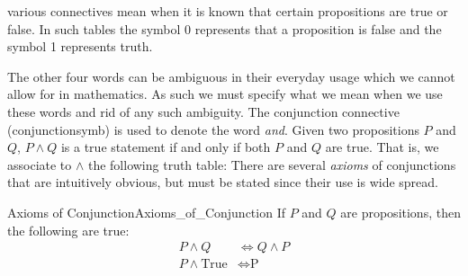         various connectives mean when it is known that certain propositions are true
        or false. In such tables the symbol 0 represents that a proposition is false
        and the symbol 1 represents truth.
        \par\hfill\par
        The other four words can be ambiguous in their everyday usage which we
        cannot allow for in mathematics. As such we must specify what we mean when
        we use these words and rid of any such ambiguity.
        The conjunction connective (\gls{conjunctionsymb}) is used to denote the
        word \textit{and}. Given two propositions $P$ and $Q$, $P\land{Q}$ is a true
        statement if and only if both $P$ and $Q$ are true. That is, we
        associate to $\land$ the following truth table:
        There are several \textit{axioms} of conjunctions that are intuitively
        obvious, but must be stated since their use is wide spread.
        \begin{faxiom}{Axioms of Conjunction}{Axioms_of_Conjunction}
            If $P$ and $Q$ are propositions, then the following are true:
            \begin{align}
                P\land{Q}&\Longleftrightarrow{Q}\land{P}
                \tag{Commutativity of Conjunction}\\
                P\land\textrm{True}&\Longleftrightarrow\textrm{P}
                \tag{Identity of Conjunction}
            \end{align}
        \end{faxiom}
